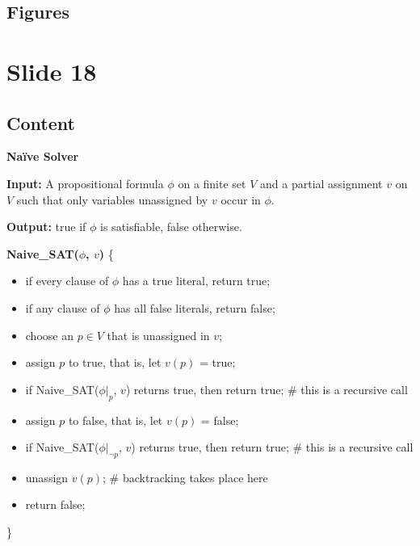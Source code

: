 \documentclass{article}%
\begin{document}
\subsection{Figures}%
\begin{figure}[H]%
\centering%
\end{figure}

%
\newpage%
\section{Slide 18}%
\label{sec:Slide18}%
\subsection{Content}%

\textbf{Naïve Solver}

\textbf{Input:} A propositional formula $\phi$ on a finite set $V$ and a partial assignment $v$ on $V$ such that only variables unassigned by $v$ occur in $\phi$.

\textbf{Output:} true if $\phi$ is satisfiable, false otherwise.

\textbf{Naive\_SAT($\phi$, $v$)} \{
\begin{itemize}
    \item if every clause of $\phi$ has a true literal, return true;
    \item if any clause of $\phi$ has all false literals, return false;
    \item choose an $p \in V$ that is unassigned in $v$;
    \item assign $p$ to true, that is, let $v(p)$ = true;
    \item if Naive\_SAT($\phi|_p$, $v$) returns true, then return true;  \# this is a recursive call
    \item assign $p$ to false, that is, let $v(p)$ = false;
    \item if Naive\_SAT($\phi|_{\neg p}$, $v$) returns true, then return true;  \# this is a recursive call
    \item unassign $v(p)$; \# backtracking takes place here
    \item return false;
\end{itemize}
\}
%
\end{document}
